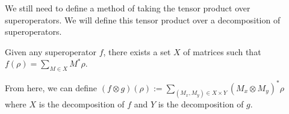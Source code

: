 We still need to define a method of taking the tensor product over superoperators.
We will define this tensor product over a decomposition of superoperators.
\begin{lemma}
    Given any superoperator $f$, there exists a set $X$ of matrices such that $f(\rho)=\sum_{M\in X}M^*\rho$.
\end{lemma}
From here, we can define $(f \otimes g) (\rho) := \sum_{(M_x, M_y) \in X \times Y}(M_x \otimes M_y)^*\rho$ where $X$ is the decomposition of $f$ and $Y$ is the decomposition of $g$.